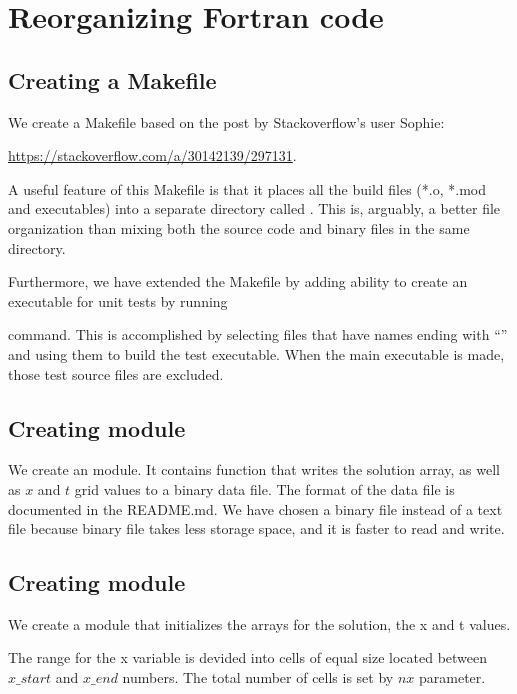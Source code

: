 \section{Reorganizing Fortran code}


\subsection{Creating a Makefile}

We create a Makefile based on the post by Stackoverflow's user Sophie:

\url{https://stackoverflow.com/a/30142139/297131}.

A useful feature of this Makefile is that it places all the build files (*.o, *.mod and executables) into a separate directory called . This is, arguably, a better file organization than mixing both the source code and binary  files in the same directory.

Furthermore, we have extended the Makefile by adding ability to create an executable for unit tests by running


command. This is accomplished by selecting files that have names ending with ``'' and using them to build the test executable. When the main executable is made, those test source files are excluded.


\subsection{Creating  module}

We create an  module. It contains  function that writes the solution array, as well as $x$ and $t$ grid values to a binary data file. The format of the data file is documented in the README.md. We have chosen a binary file instead of a text file because binary file takes less storage space, and it is faster to read and write.


\subsection{Creating  module}

We create a   module that initializes the arrays for the solution, the x and t values.

The range for the x variable is devided into cells of equal size located between $x\_start$ and $x\_end$ numbers. The total number of cells is set by $nx$ parameter. 

